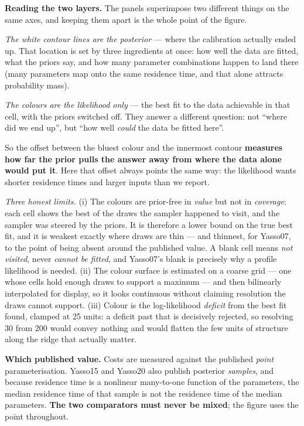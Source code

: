 \begin{methodnote}
\textbf{Reading the two layers.} The panels superimpose two different things on the same axes, and
keeping them apart is the whole point of the figure.

\emph{The white contour lines are the posterior} --- where the calibration actually ended up. That
location is set by three ingredients at once: how well the data are fitted, what the priors say, and
how many parameter combinations happen to land there (many parameters map onto the same residence
time, and that alone attracts probability mass).

\emph{The colours are the likelihood only} --- the best fit to the data achievable in that cell,
with the priors switched off. They answer a different question: not ``where did we end up'', but
``how well \emph{could} the data be fitted here''.

So the offset between the bluest colour and the innermost contour \textbf{measures how far the prior
pulls the answer away from where the data alone would put it}. Here that offset always points the
same way: the likelihood wants shorter residence times and larger inputs than we report.

\emph{Three honest limits.} (i) The colours are prior-free in \emph{value} but not in
\emph{coverage}: each cell shows the best of the draws the sampler happened to visit, and the
sampler was steered by the priors. It is therefore a lower bound on the true best fit, and it is
weakest exactly where draws are thin --- and thinnest, for Yasso07, to the point of being absent
around the published value. A blank cell means \emph{not visited}, never \emph{cannot be fitted},
and Yasso07's blank is precisely why a profile likelihood is needed. (ii) The colour surface is
estimated on a coarse grid --- one whose cells hold enough draws to support a maximum --- and then
bilinearly interpolated for display, so it looks continuous without claiming resolution the draws
cannot support. (iii) Colour is the log-likelihood \emph{deficit} from the best fit found, clamped
at 25 units: a deficit past that is decisively rejected, so resolving 30 from 200 would convey
nothing and would flatten the few units of structure along the ridge that actually matter.
\end{methodnote}

\begin{methodnote}
\textbf{Which published value.} Costs are measured against the published \emph{point}
parameterisation. Yasso15 and Yasso20 also publish posterior \emph{samples}, and because residence
time is a nonlinear many-to-one function of the parameters, the median residence time of that sample
is not the residence time of the median parameters. \textbf{The two comparators must never be
mixed}; the figure uses the point throughout.
\end{methodnote}

